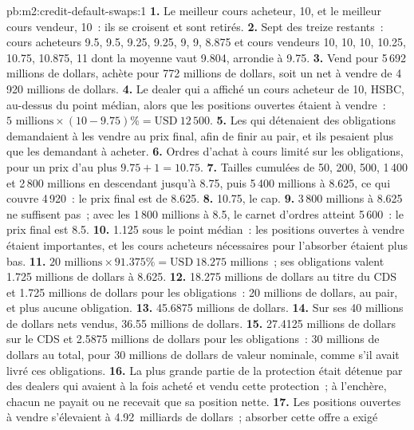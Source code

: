 \begin{solution}{pb:m2:credit-default-swaps:1}
\textbf{1.} Le meilleur cours acheteur, 10, et le meilleur cours vendeur, 10~: ils se croisent et sont retirés.
\textbf{2.} Sept des treize restants~: cours acheteurs 9.5, 9.5, 9.25, 9.25, 9, 9, 8.875 et
cours vendeurs 10, 10, 10, 10.25, 10.75, 10.875, 11 dont la moyenne vaut 9.804, arrondie à 9.75.
\textbf{3.} Vend pour 5\,692 millions de dollars, achète pour 772 millions de dollars, soit un net à vendre de 4\,920 millions de dollars.
\textbf{4.} Le dealer qui a affiché un cours acheteur de 10, HSBC, au-dessus du point médian, alors que les positions ouvertes étaient
à vendre~: $5\text{ millions} \times (10 - 9.75)\% = \text{USD}~12\,500$.
\textbf{5.} Les  qui détenaient des obligations demandaient à les vendre au prix final, afin
de finir au pair, et ils pesaient plus que les  demandant à acheter.
\textbf{6.} Ordres d'achat à cours limité sur les obligations, pour un prix d'au plus $9.75 + 1 = 10.75$.
\textbf{7.} Tailles cumulées de 50, 200, 500, 1\,400 et 2\,800 millions en descendant jusqu'à 8.75, puis
5\,400 millions à 8.625, ce qui couvre 4\,920~: le prix final est de 8.625.
\textbf{8.} 10.75, le cap.
\textbf{9.} 3\,800 millions à 8.625 ne suffisent pas~; avec les 1\,800 millions à 8.5, le
carnet d'ordres atteint 5\,600~: le prix final est 8.5.
\textbf{10.} 1.125 sous le point médian~: les positions ouvertes à vendre étaient importantes, et les cours acheteurs
nécessaires pour l'absorber étaient plus bas.
\textbf{11.} $20 \text{ millions} \times 91.375\% = \text{USD}~18.275$ millions~; ses obligations
valent 1.725 millions de dollars à 8.625.
\textbf{12.} 18.275 millions de dollars au titre du CDS et 1.725 millions de dollars pour les obligations~: 20
millions de dollars, au pair, et plus aucune obligation.
\textbf{13.} 45.6875 millions de dollars.
\textbf{14.} Sur ses 40 millions de dollars nets vendus, 36.55 millions de dollars.
\textbf{15.} 27.4125 millions de dollars sur le CDS et 2.5875 millions de dollars pour les obligations~: 30
millions de dollars au total, pour 30 millions de dollars de valeur nominale, comme s'il avait livré ces obligations.
\textbf{16.} La plus grande partie de la protection était détenue par des dealers qui avaient à la fois acheté et vendu
cette protection~; à l'enchère, chacun ne payait ou ne recevait que sa position nette.
\textbf{17.} Les positions ouvertes à vendre s'élevaient à 4.92~milliards de dollars~; absorber cette offre a exigé

\end{solution}
